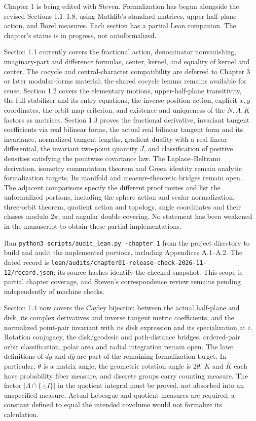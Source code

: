 Chapter 1 is being edited with Steven. Formalization has begun alongside the revised Sections 1.1--1.8, using Mathlib's standard matrices, upper-half-plane action, and Borel measures. Each section has a partial Lean companion. The chapter's status is in progress, not autoformalized.

Section 1.1 currently covers the fractional action, denominator nonvanishing, imaginary-part and difference formulas, center, kernel, and equality of kernel and center. The cocycle and central-character compatibility are deferred to Chapter 3 or later modular-forms material; the shared cocycle lemma remains available for reuse. Section 1.2 covers the elementary motions, upper-half-plane transitivity, the full stabilizer and its entry equations, the inverse position action, explicit $x,y$ coordinates, the orbit-map criterion, and existence and uniqueness of the $N,A,K$ factors as matrices. Section 1.3 proves the fractional derivative, invariant tangent coefficients via real bilinear forms, the actual real bilinear tangent form and its invariance, normalized tangent lengths, gradient duality with a real linear differential, the invariant two-point quantity $J$, and classification of positive densities satisfying the pointwise covariance law. The Laplace--Beltrami derivation, isometry commutation theorem and Green identity remain analytic formalization targets. Its manifold and measure-theoretic bridges remain open. The adjacent comparisons specify the different proof routes and list the unformalized portions, including the sphere action and scalar normalization, three-orbit theorem, quotient action and topology, angle coordinates and their classes modulo $2\pi$, and angular double covering. No statement has been weakened in the manuscript to obtain these partial implementations.

Run \texttt{python3 scripts/audit\_lean.py --chapter 1} from the project directory to build and audit the implemented portions, including Appendices A.1--A.2. The dated record is \texttt{lean/audits/chapter01-release-check-2026-11-12/record.json}; its source hashes identify the checked snapshot. This scope is partial chapter coverage, and Steven's correspondence review remains pending independently of machine checks.

Section 1.4 now covers the Cayley bijection between the actual half-plane and disk, its complex derivatives and inverse tangent metric coefficients, and the normalized point-pair invariant with its disk expression and its specialization at $i$. Rotation conjugacy, the disk/geodesic and path-distance bridges, ordered-pair orbit classification, polar area and radial integration remain open. The later definitions of $dg$ and $d\overline g$ are part of the remaining formalization target. In particular, $\theta$ is a matrix angle, the geometric rotation angle is $2\theta$, $K$ and $\overline K$ each have probability fiber measure, and discrete groups carry counting measure. The factor $|\Lambda\cap\{\pm I\}|$ in the quotient integral must be proved, not absorbed into an unspecified measure. Actual Lebesgue and quotient measures are required; a constant defined to equal the intended covolume would not formalize its calculation.

